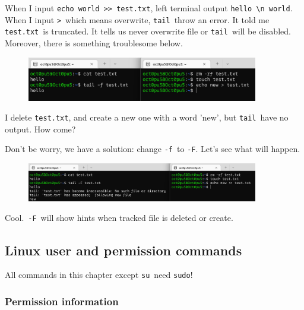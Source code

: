 \documentclass[12pt]{ctexart}
\newenvironment{mdquote}
{%
  \par\noindent
  \begin{list}{}{%
      \setlength{\leftmargin}{1em}%
      \setlength{\rightmargin}{0pt}%
      \setlength{\itemindent}{0pt}%
      \setlength{\listparindent}{\parindent}%
      \setlength{\topsep}{0.5\baselineskip}%
  }
  \item[\textbf{>}\ ]\itshape
}
{\end{list}\par}
\begin{document}
When I input
\texttt{echo\ world\ \textgreater{}\textgreater{}\ test.txt}, left
terminal output \texttt{hello\ \textbackslash{}n\ world}. When I input
\texttt{\textgreater{}}\ which means overwrite, \texttt{tail}\ throw an
error. It told me \texttt{test.txt}\ is truncated. It tells us never
overwrite file or \texttt{tail}\ will be disabled. Moreover, there is
something troublesome below.

\begin{figure}[H]
    \centering
    \includegraphics[width=0.9\textwidth,keepaspectratio]{assets/Linux/1.5 Linux file commands/16.png}
\end{figure}

I delete \texttt{test.txt}, and create a new one with a word 'new', but
\texttt{tail}\ have no output. How come?

Don't be worry, we have a solution: change \texttt{-f}\
to \texttt{-F}. Let's see what will happen.

\begin{figure}[H]
    \centering
    \includegraphics[width=0.9\textwidth,keepaspectratio]{assets/Linux/1.5 Linux file commands/17.png}
\end{figure}

Cool.\ \texttt{-F}\ will show hints when tracked file is deleted or
create.

\newpage
\subsection{\textbf{Linux user and permission commands}}
\begin{mdquote}
All commands in this chapter except \texttt{su}\ need \texttt{sudo}!
\end{mdquote}

\subsubsection{\textbf{Permission information}}
\end{document}
